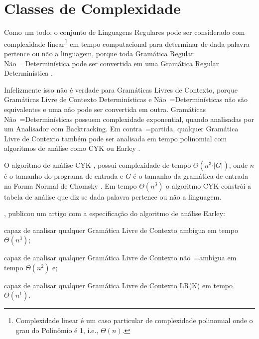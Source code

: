 \section{Classes de Complexidade}
\label{classesDeComplexidade}

Como um todo,
o conjunto de Linguagens Regulares pode ser considerado com complexidade linear\footnote{
Complexidade linear é um caso particular de complexidade polinomial onde o grau do Polinômio é 1,
i.e.,
$\Theta(n)$.
}
em tempo computacional para determinar de dada palavra pertence ou
não a linguagem,
porque toda Gramática Regular Não~=Determinística pode ser convertida em uma Gramática Regular Determinística \cite{sipserBook}.

Infelizmente isso não é verdade para Gramáticas Livres de Contexto,
porque Gramáticas Livre de Contexto Determinísticas e
Não~=Determinísticas não são equivalentes e
uma não pode ser convertida em outra.
Gramáticas Não~=Determinísticas possuem complexidade exponential,
quando analisadas por um Analisador com Backtracking.
Em contra~=partida,
qualquer Gramática Livre de Contexto também pode ser analisada em tempo polinomial com algoritmos de análise como CYK ou
Earley \cite{larkContextualLexer}.

O algoritmo de análise CYK \cite{hopcroftBook,larkContextualLexer},
possui complexidade de tempo $\Theta(n^3 \cdot \vert{G}\vert)$,
onde $n$ é o tamanho do programa de entrada e
$G$ é o tamanho da gramática de entrada na Forma Normal de Chomsky \cite{hopcroftBook}.
Em tempo $\Theta(n^3)$ o algoritmo CYK constrói a tabela de análise que diz se dada palavra pertence ou
não a linguagem.

,
publicou um artigo com a especificação do algoritmo de análise Earley:
\begin{inparaenum}[1)]
\item capaz de analisar qualquer Gramática Livre de Contexto ambígua em tempo $\Theta(n^3)$;
\item capaz de analisar qualquer Gramática Livre de Contexto não~=ambígua em tempo $\Theta(n^2)$ e;
\item capaz de analisar qualquer Gramática Livre de Contexto LR(K) em tempo $\Theta(n^1)$.
\end{inparaenum}%


